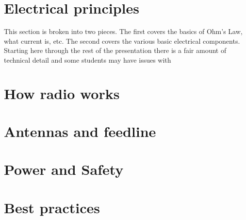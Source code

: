 \documentclass[12pt,letterpaper]{report}
\begin{document}
\section*{Electrical principles}
This section is broken into two pieces. The first covers the basics of Ohm's Law, what current is, etc. The second covers the various basic electrical components. Starting here through the rest of the presentation there is a fair amount of technical detail and some students may have issues with 

\section*{How radio works}

\section*{Antennas and feedline}

\section*{Power and Safety}

\section*{Best practices}
\end{document}

